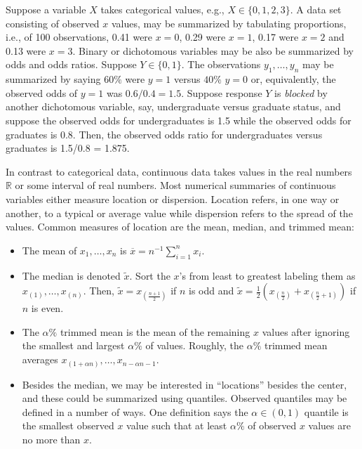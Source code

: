 \documentclass[
]{book}
\providecommand{\tightlist}{%
  \setlength{\itemsep}{0pt}\setlength{\parskip}{0pt}}
\theoremstyle{definition}
\theoremstyle{definition}
\theoremstyle{definition}
\theoremstyle{definition}
\theoremstyle{remark}
\begin{document}
Suppose a variable \(X\) takes categorical values, e.g., \(X\in\{0,1,2,3\}\). A data set consisting of observed \(x\) values, may be summarized by tabulating proportions, i.e., of 100 observations, 0.41 were \(x=0\), 0.29 were \(x = 1\), 0.17 were \(x = 2\) and 0.13 were \(x=3\). Binary or dichotomous variables may be also be summarized by odds and odds ratios. Suppose \(Y\in\{0,1\}\). The observations \(y_1, \ldots, y_n\) may be summarized by saying \(60\%\) were \(y=1\) versus \(40\%\) \(y=0\) or, equivalently, the observed odds of \(y=1\) was \(0.6/0.4 = 1.5\). Suppose response \(Y\) is \emph{blocked} by another dichotomous variable, say, undergraduate versus graduate status, and suppose the observed odds for undergraduates is 1.5 while the observed odds for graduates is 0.8. Then, the observed odds ratio for undergraduates versus graduates is 1.5/0.8 = 1.875.

In contrast to categorical data, continuous data takes values in the real numbers \(\mathbb{R}\) or some interval of real numbers. Most numerical summaries of continuous variables either measure location or dispersion. Location refers, in one way or another, to a typical or average value while dispersion refers to the spread of the values. Common measures of location are the mean, median, and trimmed mean:

\begin{itemize}
\tightlist
\item
  The mean of \(x_1, \ldots, x_n\) is \(\overline x = n^{-1}\sum_{i=1}^n x_i\).
\item
  The median is denoted \(\tilde x\). Sort the \(x\)'s from least to greatest labeling them as \(x_{(1)}, \ldots, x_{(n)}\). Then, \(\tilde x = x_{(\frac{n+1}{2})}\) if \(n\) is odd and \(\tilde x = \tfrac12\left(x_{(\frac{n}{2})} + x_{(\frac{n}{2}+1)}\right)\) if \(n\) is even.
\item
  The \(\alpha\%\) trimmed mean is the mean of the remaining \(x\) values after ignoring the smallest and largest \(\alpha\%\) of values. Roughly, the \(\alpha\%\) trimmed mean averages \(x_{(1+\alpha n)},\ldots, x_{n - \alpha n - 1}\).
\item
  Besides the median, we may be interested in ``locations'' besides the center, and these could be summarized using quantiles. Observed quantiles may be defined in a number of ways. One definition says the \(\alpha\in(0,1)\) quantile is the smallest observed \(x\) value such that at least \(\alpha\%\) of observed \(x\) values are no more than \(x\).
\end{itemize}
\end{document}
